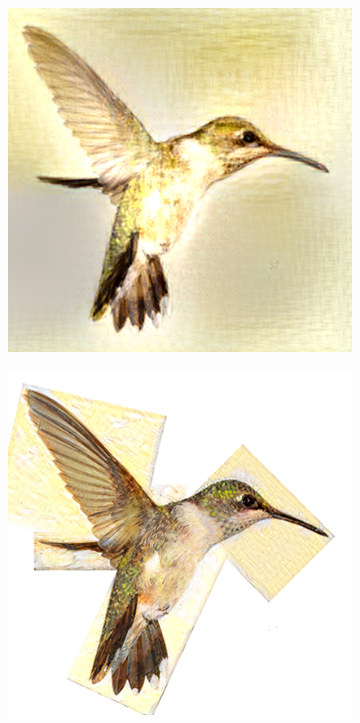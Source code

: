 \begin{figure}[t]
\begin{subfigure}[b]{0.244\textwidth}
  \end{subfigure}
  \hfill
  \begin{subfigure}[b]{0.244\textwidth}
    \includegraphics[width=\textwidth]{gfx/app-content-aware-3}
  \end{subfigure}
  \begin{subfigure}[b]{0.244\textwidth}
    \includegraphics[width=\textwidth]{gfx/app-content-aware-4}

\end{subfigure}
\end{figure}
